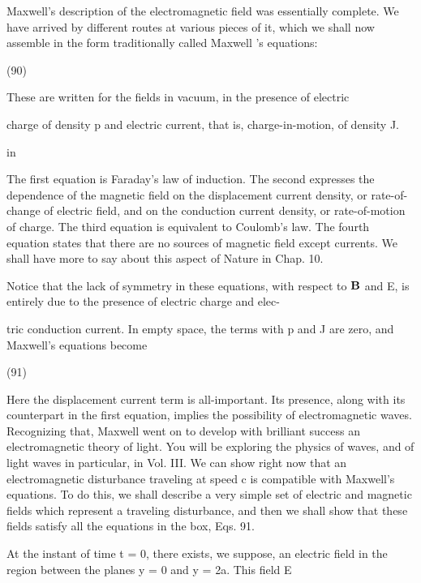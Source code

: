 Maxwell's description of the electromagnetic field was essentially
complete. We have arrived by different routes at various pieces of it,
which we shall now assemble in the form traditionally called
Maxwell 's equations:

\begin{equation}
\end{equation}
(90)

 

These are written for the fields in vacuum, in the presence of electric

charge of density p and electric current, that is, charge-in-motion,
of density J.

in

The first equation is Faraday's law of induction. The second
expresses the dependence of the magnetic field on the displacement
current density, or rate-of-change of electric field, and on the conduction
current density, or rate-of-motion of charge. The third
equation is equivalent to Coulomb's law. The fourth equation states
that there are no sources of magnetic field except currents. We shall
have more to say about this aspect of Nature in Chap. 10.

Notice that the lack of symmetry in these equations, with respect
to $\mathbf{B}$ and E, is entirely due to the presence of electric charge and elec-

tric conduction current. In empty space, the terms with p and J are
zero, and Maxwell's equations become

\begin{equation}
\end{equation}
(91)

 

Here the displacement current term is all-important. Its presence,
along with its counterpart in the first equation, implies the possibility
of electromagnetic waves. Recognizing that, Maxwell went on to
develop with brilliant success an electromagnetic theory of light.
You will be exploring the physics of waves, and of light waves in
particular, in Vol. III. We can show right now that an electromagnetic
disturbance traveling at speed c is compatible with Maxwell's
equations. To do this, we shall describe a very simple set of electric
and magnetic fields which represent a traveling disturbance, and
then we shall show that these fields satisfy all the equations in the
box, Eqs. 91.

At the instant of time t = 0, there exists, we suppose, an electric
field in the region between the planes y = 0 and y = 2a. This field E

